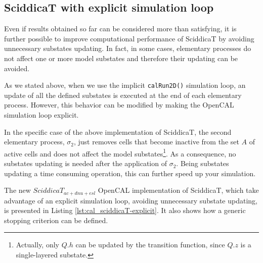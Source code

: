 \subsection{SciddicaT with explicit simulation loop}
Even if results obtained so far can be considered more than
satisfying, it is further possible to improve computational
performance of SciddicaT by avoiding unnecessary substates
updating. In fact, in some cases, elementary processes do not affect
one or more model substates and therefore their updating can be
avoided.

As we stated above, when we use the implicit \verb'calRun2D()'
simulation loop, an update of all the defined substates is executed at
the end of each elementary process. However, this behavior can be
modified by making the OpenCAL simulation loop explicit.

In the specific case of the above implementation of SciddicaT, the
second elementary process, $\sigma_2$, just removes cells that become
inactive from the set $A$ of active cells and does not affect the
model substates\footnote{Actually, only $Q.h$ can be updated by the
  transition function, since $Q.z$ is a single-layered substate.}. As
a consequence, no substates updating is needed after the application
of $\sigma_2$. Being substates updating a time consuming operation,
this can further speed up your simulation.

The new $SciddicaT_{ac+dnu+esl}$ OpenCAL implementation of SciddicaT,
which take advantage of an explicit simulation loop, avoiding
unnecessary substate updating, is presented in Listing
\ref{lst:cal_sciddicaT-explicit}. It also shows how a generic stopping
criterion can be defined.






